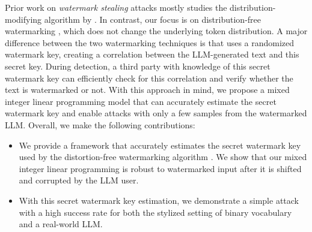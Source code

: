 Prior work on \emph{watermark stealing} attacks mostly studies the distribution-modifying algorithm by \citet{kirchenbauer2023watermark}. In contrast, our focus is on distribution-free watermarking \citep{kuditipudi2024robust}, which does not change the underlying token distribution. A major difference between the two watermarking techniques is that \citet{kuditipudi2024robust} uses a randomized watermark key, creating a correlation between the LLM-generated text and this secret key. During detection, a third party with knowledge of this secret watermark key can efficiently check for this correlation and verify whether the text is watermarked or not. With this approach in mind, we propose a mixed integer linear programming model that can accurately estimate the secret watermark key and enable  attacks with only a few samples from the watermarked LLM. Overall, we make the following contributions:
%
\begin{itemize}
    \item We provide a framework that accurately estimates the secret watermark key used by the distortion-free watermarking algorithm \citep{kuditipudi2024robust}. We show that our mixed integer linear programming is robust to watermarked input after it is shifted and corrupted by the LLM user.  
    \item With this secret watermark key estimation, we demonstrate a simple  attack with a high success rate for both the stylized setting of binary vocabulary and a real-world LLM. 
\end{itemize}